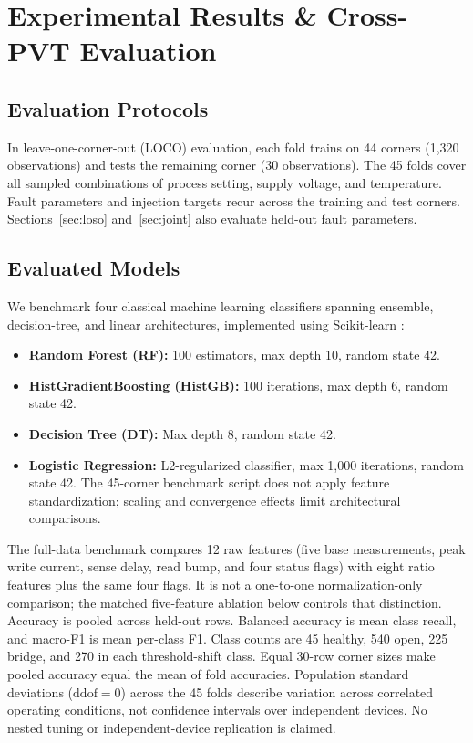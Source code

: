 \documentclass[conference]{IEEEtran}
\begin{document}

\section{Experimental Results \& Cross-PVT Evaluation}
\label{sec:results}

\subsection{Evaluation Protocols}
In leave-one-corner-out (LOCO) evaluation, each fold trains on 44 corners (1,320 observations) and tests the remaining corner (30 observations). The 45 folds cover all sampled combinations of process setting, supply voltage, and temperature. Fault parameters and injection targets recur across the training and test corners. Sections~\ref{sec:loso} and~\ref{sec:joint} also evaluate held-out fault parameters.

\subsection{Evaluated Models}
We benchmark four classical machine learning classifiers spanning ensemble, decision-tree, and linear architectures, implemented using Scikit-learn \cite{pedregosa2011scikit}:
\begin{itemize}
    \item \textbf{Random Forest (RF):} 100 estimators, max depth 10, random state 42.
    \item \textbf{HistGradientBoosting (HistGB):} 100 iterations, max depth 6, random state 42.
    \item \textbf{Decision Tree (DT):} Max depth 8, random state 42.
    \item \textbf{Logistic Regression:} L2-regularized classifier, max 1,000 iterations, random state 42. The 45-corner benchmark script does not apply feature standardization; scaling and convergence effects limit architectural comparisons.
\end{itemize}

The full-data benchmark compares 12 raw features (five base measurements, peak write current, sense delay, read bump, and four status flags) with eight ratio features plus the same four flags. It is not a one-to-one normalization-only comparison; the matched five-feature ablation below controls that distinction. Accuracy is pooled across held-out rows. Balanced accuracy is mean class recall, and macro-F1 is mean per-class F1. Class counts are 45 healthy, 540 open, 225 bridge, and 270 in each threshold-shift class. Equal 30-row corner sizes make pooled accuracy equal the mean of fold accuracies. Population standard deviations ($\mathrm{ddof}=0$) across the 45 folds describe variation across correlated operating conditions, not confidence intervals over independent devices. No nested tuning or independent-device replication is claimed.
\end{document}
